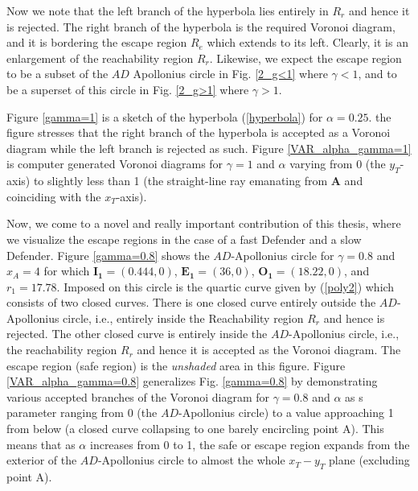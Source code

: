 Now we note that the left branch of the hyperbola lies entirely in $R_{r}$ and hence it is rejected. The right branch of the hyperbola is the required Voronoi diagram, and it is bordering the escape region $R_{e}$ which extends to its left. Clearly, it is an enlargement of the reachability region $R_{r}$. Likewise, we expect the escape region to be a subset of the $AD$ Apollonius circle in Fig. \ref{2_g<1} where $\gamma<1$, and to be a superset of this circle in Fig. \ref{2_g>1} where $\gamma>1$.   

Figure \ref{gamma=1} is a sketch of the hyperbola (\ref{hyperbola}) for $\alpha=0.25$. the figure stresses that the right branch of the hyperbola is accepted as a Voronoi diagram while the left branch is rejected as such. Figure \ref{VAR_alpha_gamma=1} is computer generated Voronoi diagrams for $\gamma=1$ and $\alpha$ varying from 0 (the $y_T$-axis) to slightly less than 1 (the straight-line ray emanating from $\boldsymbol{A}$ and coinciding with the $x_T$-axis).

Now, we come to a novel and really important contribution of this thesis, where we visualize the escape regions in the case of a fast Defender and a slow Defender. Figure \ref{gamma=0.8} shows the $AD$-Apollonius circle for $\gamma=0.8$ and $x_A=4$ for which $\boldsymbol{I_1}=(0.444,0)$, $\boldsymbol{E_1}=(36,0)$, $\boldsymbol{O_1}=(18.22,0)$, and $r_1=17.78$. Imposed on this circle is the quartic curve given by (\ref{poly2}) which consists of two closed curves. There is one closed curve entirely outside the $AD$-Apollonius circle, i.e., entirely inside the Reachability region $R_r$ and hence is rejected. The other closed curve is entirely inside the $AD$-Apollonius circle, i.e., the reachability region $R_r$ and hence it is accepted as the Voronoi diagram. The escape region (safe region) is the \textit{unshaded} area in this figure. Figure \ref{VAR_alpha_gamma=0.8} generalizes Fig. \ref{gamma=0.8} by demonstrating various accepted branches of the Voronoi diagram for $\gamma=0.8$ and $\alpha$ as s parameter ranging from 0 (the $AD$-Apollonius circle) to a value approaching 1 from below (a closed curve collapsing to one barely encircling point A). This means that as $\alpha$ increases from 0 to 1, the safe or escape region expands from the exterior of the $AD$-Apollonius circle to almost the whole $x_T-y_T$ plane (excluding point A).


